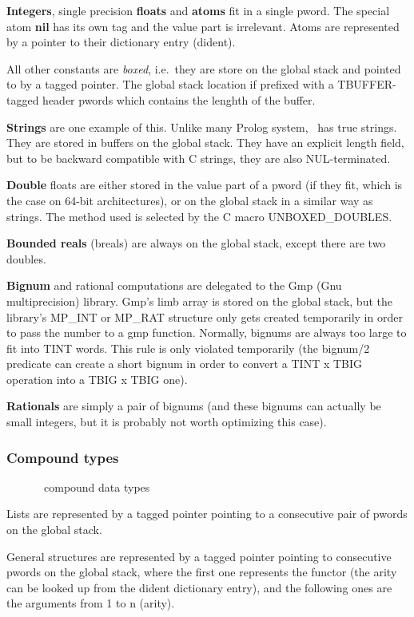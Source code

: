 {\bf Integers}, single precision {\bf floats} and {\bf atoms} fit in a single pword.
The special atom {\bf nil} has its own tag and the value part is irrelevant.
Atoms are represented by a pointer to their dictionary entry (dident).

All other constants are {\it boxed}, i.e.\ they are store on the
global stack and pointed to by a tagged pointer.
The global stack location if prefixed with a TBUFFER-tagged header
pwords which contains the lenghth of the buffer.

{\bf Strings} are one example of this.
Unlike many Prolog system, \eclipse\ has true strings. They are stored in
buffers on the global stack. They have an explicit length field, but to
be backward compatible with C strings, they are also NUL-terminated.

{\bf Double} floats are either stored in the value part of a pword (if they fit,
which is the case on 64-bit architectures), or on the global stack in a similar way
as strings. The method used is selected by the C macro UNBOXED_DOUBLES.

{\bf Bounded reals} (breals) are always on the global stack, except there are
two doubles.

{\bf Bignum} and rational computations are delegated to the Gmp (Gnu multiprecision)
library.  Gmp's limb array is stored on the global stack, but the
library's MP_INT or MP_RAT structure only gets created temporarily
in order to pass the number to a gmp function.
Normally, bignums are always too large to fit into TINT words. This rule is
only violated temporarily (the bignum/2 predicate can create a short
bignum in order to convert a TINT x TBIG operation into a TBIG x TBIG one).

{\bf Rationals} are simply a pair of bignums (and these bignums can actually
be small integers, but it is probably not worth optimizing this case).

\subsubsection{Compound types}
\begin{figure}
\caption{\eclipse\ compound data types}
\end{figure}
Lists are represented by a tagged pointer pointing to a consecutive
pair of pwords on the global stack.

General structures are represented by a tagged pointer pointing to
consecutive pwords on the global stack, where the first one represents
the functor (the arity can be looked up from the dident dictionary entry),
and the following ones are the arguments from 1 to n (arity).


